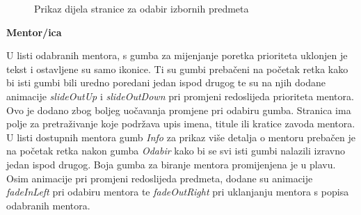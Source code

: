 \documentclass[times, utf8, zavrsni, numeric]{fer}
\begin{document}
        \begin{figure} [H]
          \centering
          \caption{Prikaz dijela stranice za odabir izbornih predmeta}
        \end{figure}
        
        \noindent\textbf{Mentor/ica}
        
        U listi odabranih mentora, s gumba za mijenjanje poretka prioriteta uklonjen je tekst i ostavljene su samo ikonice. Ti su gumbi prebačeni na početak retka kako bi isti gumbi bili uredno poredani jedan ispod drugog te su na njih dodane animacije \textit{slideOutUp} i \textit{slideOutDown} pri promjeni redoslijeda prioriteta mentora. Ovo je dodano zbog boljeg uočavanja promjene pri odabiru gumba. Stranica ima polje za pretraživanje koje podržava upis imena, titule ili kratice zavoda mentora. U listi dostupnih mentora gumb \textit{Info} za prikaz više detalja o mentoru prebačen je na početak retka nakon gumba \textit{Odabir} kako bi se svi isti gumbi nalazili izravno jedan ispod drugog. Boja gumba za biranje mentora promijenjena je u plavu. Osim animacije pri promjeni redoslijeda predmeta, dodane su animacije \textit{fadeInLeft} pri odabiru mentora te \textit{fadeOutRight} pri uklanjanju mentora s popisa odabranih mentora.
        
\end{document}
